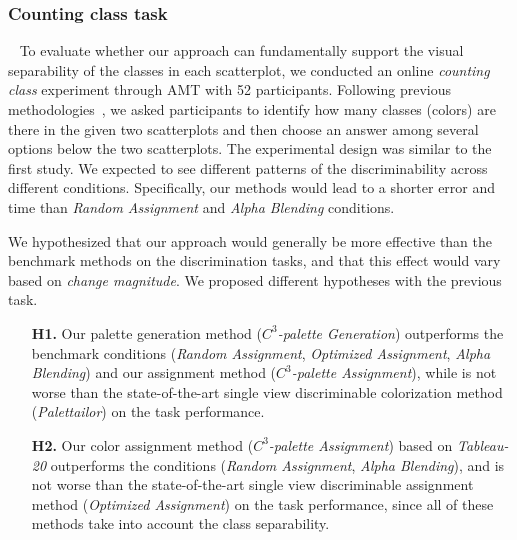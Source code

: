 {\subsubsection{Counting class task}
\
\newline
To evaluate whether our approach can fundamentally support the visual separability of the classes in each scatterplot, we conducted an online \emph{counting class} experiment through AMT with 52 participants. Following previous methodologies~\cite{Wang2018, Lu21}, we asked participants to identify how many classes (colors) are there in the given two scatterplots and then choose an answer among several options below the two scatterplots. The experimental design was similar to the first study.
We expected to see different patterns of the discriminability across different conditions. Specifically, our methods would lead to a shorter error and time than \emph{Random Assignment} and \emph{Alpha Blending} conditions.

\vspace{.3em}
 We hypothesized that our approach would generally be more effective than the benchmark methods on the discrimination tasks, and that this effect would vary based on \emph{change magnitude}. %
We proposed different hypotheses with the previous task.
\begin{itemize}[noitemsep]
\setlength{\itemsep}{5pt}
    \item[\textbf{H1.}] Our palette generation method (\emph{$C^3$-palette Generation}) outperforms the benchmark conditions (\emph{Random Assignment}, \emph{Optimized Assignment}, \emph{Alpha Blending}) and our assignment method (\emph{$C^3$-palette Assignment}), while is not worse than the state-of-the-art single view discriminable colorization method (\emph{Palettailor}) on the task performance.

    \item [\textbf{H2.}] Our color assignment method (\emph{$C^3$-palette Assignment}) based on \emph{Tableau-20} outperforms the conditions (\emph{Random Assignment}, \emph{Alpha Blending}), and is not worse than the state-of-the-art single view discriminable assignment method (\emph{Optimized Assignment}) on the task performance, since all of these methods take into account the class separability.



\end{itemize}}
